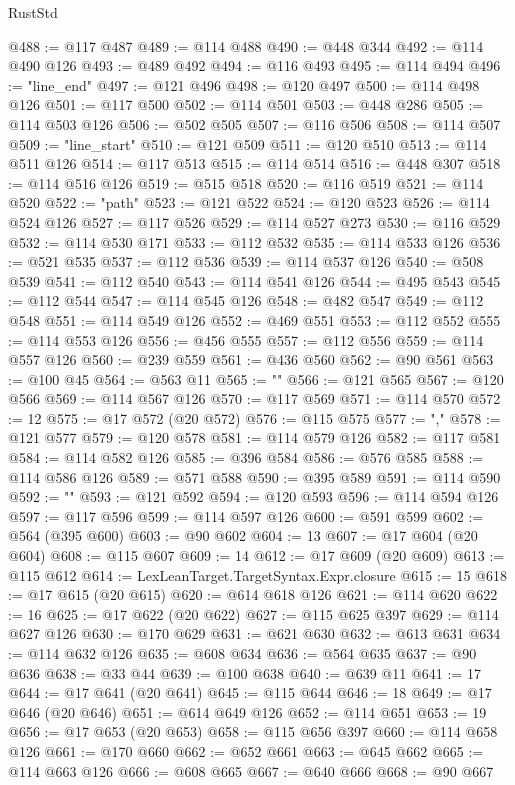 \begin{lexlean}{RustStd}
\begin{coremodule}
@488 := @117 @487
@489 := @114 @488
@490 := @448 @344
@492 := @114 @490 @126
@493 := @489 @492
@494 := @116 @493
@495 := @114 @494
@496 := "line_end"
@497 := @121 @496
@498 := @120 @497
@500 := @114 @498 @126
@501 := @117 @500
@502 := @114 @501
@503 := @448 @286
@505 := @114 @503 @126
@506 := @502 @505
@507 := @116 @506
@508 := @114 @507
@509 := "line_start"
@510 := @121 @509
@511 := @120 @510
@513 := @114 @511 @126
@514 := @117 @513
@515 := @114 @514
@516 := @448 @307
@518 := @114 @516 @126
@519 := @515 @518
@520 := @116 @519
@521 := @114 @520
@522 := "path"
@523 := @121 @522
@524 := @120 @523
@526 := @114 @524 @126
@527 := @117 @526
@529 := @114 @527 @273
@530 := @116 @529
@532 := @114 @530 @171
@533 := @112 @532
@535 := @114 @533 @126
@536 := @521 @535
@537 := @112 @536
@539 := @114 @537 @126
@540 := @508 @539
@541 := @112 @540
@543 := @114 @541 @126
@544 := @495 @543
@545 := @112 @544
@547 := @114 @545 @126
@548 := @482 @547
@549 := @112 @548
@551 := @114 @549 @126
@552 := @469 @551
@553 := @112 @552
@555 := @114 @553 @126
@556 := @456 @555
@557 := @112 @556
@559 := @114 @557 @126
@560 := @239 @559
@561 := @436 @560
@562 := @90 @561
@563 := @100 @45
@564 := @563 @11
@565 := "{"
@566 := @121 @565
@567 := @120 @566
@569 := @114 @567 @126
@570 := @117 @569
@571 := @114 @570
@572 := 12
@575 := @17 @572 (@20 @572)
@576 := @115 @575
@577 := ","
@578 := @121 @577
@579 := @120 @578
@581 := @114 @579 @126
@582 := @117 @581
@584 := @114 @582 @126
@585 := @396 @584
@586 := @576 @585
@588 := @114 @586 @126
@589 := @571 @588
@590 := @395 @589
@591 := @114 @590
@592 := "}"
@593 := @121 @592
@594 := @120 @593
@596 := @114 @594 @126
@597 := @117 @596
@599 := @114 @597 @126
@600 := @591 @599
@602 := @564 (@395 @600)
@603 := @90 @602
@604 := 13
@607 := @17 @604 (@20 @604)
@608 := @115 @607
@609 := 14
@612 := @17 @609 (@20 @609)
@613 := @115 @612
@614 := LexLeanTarget.TargetSyntax.Expr.closure
@615 := 15
@618 := @17 @615 (@20 @615)
@620 := @614 @618 @126
@621 := @114 @620
@622 := 16
@625 := @17 @622 (@20 @622)
@627 := @115 @625 @397
@629 := @114 @627 @126
@630 := @170 @629
@631 := @621 @630
@632 := @613 @631
@634 := @114 @632 @126
@635 := @608 @634
@636 := @564 @635
@637 := @90 @636
@638 := @33 @44
@639 := @100 @638
@640 := @639 @11
@641 := 17
@644 := @17 @641 (@20 @641)
@645 := @115 @644
@646 := 18
@649 := @17 @646 (@20 @646)
@651 := @614 @649 @126
@652 := @114 @651
@653 := 19
@656 := @17 @653 (@20 @653)
@658 := @115 @656 @397
@660 := @114 @658 @126
@661 := @170 @660
@662 := @652 @661
@663 := @645 @662
@665 := @114 @663 @126
@666 := @608 @665
@667 := @640 @666
@668 := @90 @667

\end{coremodule}
\end{lexlean}
